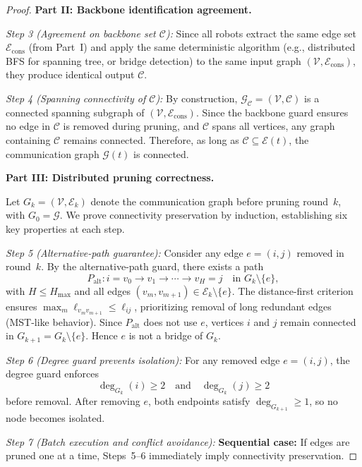 \begin{proof}
\medskip
\noindent\textbf{Part II: Backbone identification agreement.}

\emph{Step 3 (Agreement on backbone set $\mathcal{C}$):}
Since all robots extract the same edge set $\mathcal{E}_{\mathrm{cons}}$ (from Part~I) and apply the same deterministic algorithm (e.g., distributed BFS for spanning tree, or bridge detection) to the same input graph $(\mathcal{V},\mathcal{E}_{\mathrm{cons}})$, they produce identical output $\mathcal{C}$.

\emph{Step 4 (Spanning connectivity of $\mathcal{C}$):}
By construction, $\mathcal{G}_{\mathcal{C}}=(\mathcal{V},\mathcal{C})$ is a connected spanning subgraph of $(\mathcal{V},\mathcal{E}_{\mathrm{cons}})$.
Since the backbone guard ensures no edge in $\mathcal{C}$ is removed during pruning, and $\mathcal{C}$ spans all vertices, any graph containing $\mathcal{C}$ remains connected.
Therefore, as long as $\mathcal{C}\subseteq\mathcal{E}(t)$, the communication graph $\mathcal{G}(t)$ is connected.

\medskip
\noindent\textbf{Part III: Distributed pruning correctness.}

Let $G_k=(\mathcal{V},\mathcal{E}_k)$ denote the communication graph before pruning round~$k$, with $G_0=\mathcal{G}$.
We prove connectivity preservation by induction, establishing six key properties at each step.

\emph{Step 5 (Alternative-path guarantee):}
Consider any edge $e=(i,j)$ removed in round~$k$.
By the alternative-path guard, there exists a path
\[
P_{\mathrm{alt}}: i=v_0\to v_1\to\cdots\to v_H=j \quad\text{in }G_k\setminus\{e\},
\]
with $H\le H_{\max}$ and all edges $(v_m,v_{m+1})\in\mathcal{E}_k\setminus\{e\}$.
The distance-first criterion ensures $\max_m\ell_{v_m v_{m+1}}\le\ell_{ij}$, prioritizing removal of long redundant edges (MST-like behavior).
Since $P_{\mathrm{alt}}$ does not use $e$, vertices $i$ and $j$ remain connected in $G_{k+1}=G_k\setminus\{e\}$.
Hence $e$ is not a bridge of $G_k$.

\emph{Step 6 (Degree guard prevents isolation):}
For any removed edge $e=(i,j)$, the degree guard enforces
\[
\deg_{G_k}(i)\ge 2 \quad\text{and}\quad \deg_{G_k}(j)\ge 2
\]
before removal. After removing $e$, both endpoints satisfy $\deg_{G_{k+1}}\ge 1$, so no node becomes isolated.

\emph{Step 7 (Batch execution and conflict avoidance):}
\textbf{Sequential case:} If edges are pruned one at a time, Steps~5--6 immediately imply connectivity preservation.


\end{proof}
